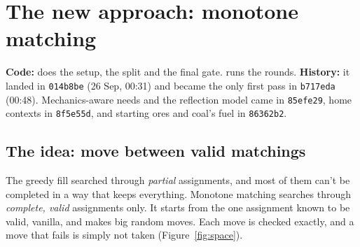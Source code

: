 \section{The new approach: monotone matching}
\label{sec:matching}

\noindent\textbf{Code:}  does the setup, the split and the final gate.  runs the rounds. \textbf{History:} it landed in \texttt{014b8be} (26 Sep, 00:31) and became the only first pass in \texttt{b717eda} (00:48). Mechanics-aware needs and the reflection model came in \texttt{85efe29}, home contexts in \texttt{8f5e55d}, and starting ores and coal's fuel in \texttt{86362b2}.

\subsection{The idea: move between valid matchings}

The greedy fill searched through \emph{partial} assignments, and most of them can't be completed in a way that keeps everything. Monotone matching searches through \emph{complete, valid} assignments only. It starts from the one assignment known to be valid, vanilla, and makes big random moves. Each move is checked exactly, and a move that fails is simply not taken (Figure~\ref{fig:space}).

